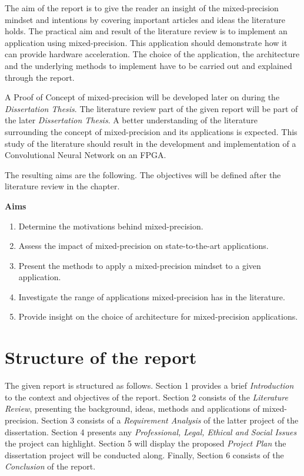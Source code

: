 The aim of the report is to give the reader an insight of the mixed-precision mindset and intentions by covering important articles and ideas the literature holds. The practical aim and result of the literature review is to implement an application using mixed-precision. This application should demonstrate how it can provide hardware acceleration. The choice of the application, the architecture and the underlying methods to implement have to be carried out and explained through the report.

A Proof of Concept of mixed-precision will be developed later on during the \emph{Dissertation Thesis}. The literature review part of the given report will be part of the later \emph{Dissertation Thesis}. A better understanding of the literature surrounding the concept of mixed-precision and its applications is expected. This study of the literature should result in the development and implementation of a Convolutional Neural Network on an FPGA.

The resulting aims are the following. The objectives will be defined after the literature review in the  chapter.

\textbf{Aims}
\begin{enumerate}
  \item Determine the motivations behind mixed-precision.
  \item Assess the impact of mixed-precision on state-to-the-art applications.
  \item Present the methods to apply a mixed-precision mindset to a given application.
  \item Investigate the range of applications mixed-precision has in the literature.
  \item Provide insight on the choice of architecture for mixed-precision applications.
\end{enumerate}


\section{Structure of the report}

The given report is structured as follows. Section 1 provides a brief \emph{Introduction} to the context and objectives of the report. Section 2 consists of the \emph{Literature Review}, presenting the background, ideas, methods and applications of mixed-precision. Section 3 consists of a \emph{Requirement Analysis} of the latter project of the dissertation. Section 4 presents any \emph{Professional, Legal, Ethical and Social Issues} the project can highlight. Section 5 will display the proposed \emph{Project Plan} the dissertation project will be conducted along. Finally, Section 6 consists of the \emph{Conclusion} of the report.
